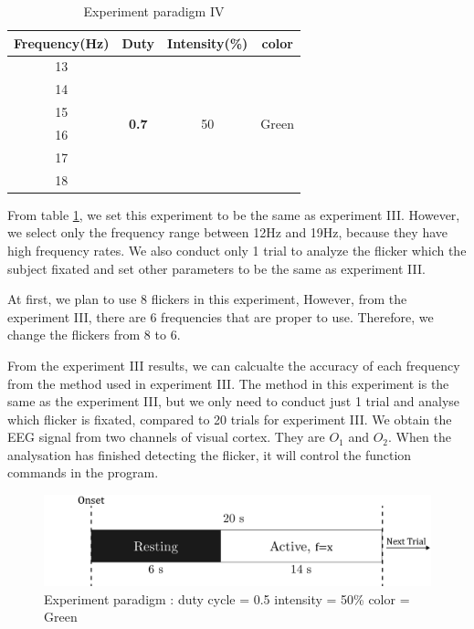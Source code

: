 \begin{table}[ht]
\centering
\begin{tabular}{| c | c | c | c |}
	\hline 
    \textbf{Frequency(Hz)}&\textbf{Duty}&\textbf{Intensity(\%)}&\textbf{color}\\
    \hline
    13&\multirow{6}{*}{\textbf{0.7}}&
    \multirow{6}{*}{50}&
    \multirow{6}{*}{Green}\\
    \cline{1-1}
    14&&&\\ \cline{1-1}
    15&&&\\ \cline{1-1}
    16&&&\\ \cline{1-1}
    17&&&\\ \cline{1-1}
    18&&&\\ \cline{1-1}
    \hline
	\end{tabular}       
\caption{Experiment paradigm IV}
\label{table:paradigm_4}
\end{table}
From table \ref{table:paradigm_4}, we set this experiment to be the same as experiment III. However, we select only the frequency range between 12Hz and 19Hz, because they have high frequency rates. We also conduct only 1 trial to analyze the flicker which the subject fixated and set other parameters to be the same as experiment III.

At first, we plan to use 8 flickers in this experiment, However, from the experiment III, there are 6 frequencies that are proper to use. Therefore,  we change the flickers from 8 to 6. 


From the experiment III results, we can calcualte the accuracy of each frequency from the method used in experiment III. The method in this experiment is the same as the experiment III, but we only need to conduct just 1 trial and analyse which flicker is fixated, compared to 20 trials for experiment III. We obtain the EEG signal from two channels of visual cortex. They are $O_1$ and $O_2$. When the analysation has finished detecting the flicker, it will control the function commands in the program. 

\begin{figure}[ht]
	\centering
	\includegraphics[scale = 0.3]{chapter7/scale.pdf}
	\caption{Experiment paradigm : duty cycle = 0.5 intensity = 50\% color = Green}
    \label{fig:para}
\end{figure}


